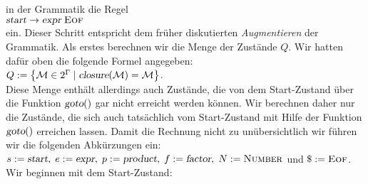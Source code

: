 in der Grammatik die Regel
\\[0.2cm]
\hspace*{1.3cm}
$\textsl{start} \rightarrow \textsl{expr}\; \textsc{Eof}$
\\[0.2cm]
ein.  Dieser Schritt entspricht dem fr\"uher diskutierten \emph{Augmentieren} der Grammatik.
Als erstes berechnen wir die Menge der Zust\"ande $Q$.  Wir hatten daf\"ur oben die
folgende Formel angegeben:
\\[0.2cm]
\hspace*{1.3cm}
$Q := \bigl\{ \mathcal{M} \in 2^\Gamma \mid \textsl{closure}(\mathcal{M}) = \mathcal{M} \bigr\}$.
\\[0.2cm]
Diese Menge enth\"alt allerdings auch Zust\"ande, die von dem Start-Zustand \"uber die Funktion
$\textsl{goto}()$ gar nicht erreicht werden k\"onnen.  Wir berechnen daher nur die Zust\"ande,
die sich auch tats\"achlich vom Start-Zustand mit Hilfe der Funktion $\textsl{goto}()$
erreichen lassen.  Damit die Rechnung nicht zu un\"ubersichtlich
wir f\"uhren wir die folgenden Abk\"urzungen ein:
\\[0.2cm]
\hspace*{1.3cm}
$s := \textsl{start},\; e := \textsl{expr},\; p := \textsl{product},\; 
   f := \textsl{factor},\; N := \textsc{Number}$ und $\symbol{36} := \textsc{Eof}$. 
\\[0.2cm]
Wir beginnen mit dem Start-Zustand: 
